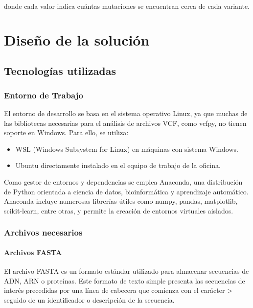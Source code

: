 \documentclass[11pt,spanish,listoffigures,listoftables]{tfgetsinf}
\begin{document}
donde cada valor indica cuántas mutaciones se encuentran cerca de cada variante.



\chapter{Diseño de la solución }


\section{Tecnologías utilizadas}

\subsection{Entorno de Trabajo}

El entorno de desarrollo se basa en el sistema operativo Linux, ya que muchas de las bibliotecas necesarias para el análisis de archivos \acs{VCF}, como vcfpy, no tienen soporte en Windows. Para ello, se utiliza:
\begin{itemize}
   \item WSL (Windows Subsystem for Linux) en máquinas con sistema Windows.
   \item Ubuntu directamente instalado en el equipo de trabajo de la oficina.
\end{itemize}

Como gestor de entornos y dependencias se emplea Anaconda, una distribución de Python orientada a ciencia de datos, bioinformática y aprendizaje automático. Anaconda incluye numerosas librerías útiles como numpy, pandas, matplotlib, scikit-learn, entre otras, y permite la creación de entornos virtuales aislados.

\subsection{Archivos necesarios}

\subsubsection{Archivos FASTA}

El archivo \acs{FASTA} es un formato estándar utilizado para almacenar secuencias de \acs{ADN}, \acs{ARN} o proteínas. Este formato de texto simple presenta las secuencias de interés precedidas por una línea de cabecera que comienza con el carácter > seguido de un identificador o descripción de la secuencia. 
\end{document}
